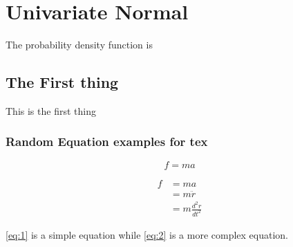 \documentclass[../../main.tex]{subfiles}
\begin{document}
\chapter{Univariate Normal}
The probability density function is





\section{The First thing}
This is the first thing


\subsection{Random Equation examples for tex}

\begin{equation}
    \label{eq:1}
    f = ma
\end{equation}

\begin{align}
    \label{eq:2}
    f &= ma\\
      &= m\ddot{r}\nonumber\\
      &= m\frac{d^2r}{dt^2}\nonumber
\end{align}

\eqref{eq:1} is a simple equation while \eqref{eq:2} is a
more complex equation. 

 
\end{document}
